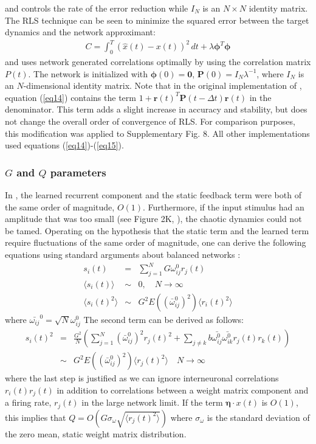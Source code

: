 \documentclass[11pt]{article} %
\begin{document}
and controls the rate of the error reduction while $I_N$ is an $N\times N$ identity matrix.  
The RLS technique can be seen to minimize the squared error between 
the target dynamics and the network approximant:
\begin{eqnarray}
C = \int_0^T(\hat{x}(t)-x(t))^2\,dt + \lambda \bm{\phi}^T \bm{\phi}  
\end{eqnarray}
and uses network generated correlations optimally by using the correlation matrix $P(t)$.  
The network is initialized with $\bm{\phi}(0) = \bm 0$, $\bm P(0) = I_N\lambda^{-1}$, 
where $I_N$ is an $N$-dimensional identity matrix.  
Note that in the original implementation of \cite{FORCE1}, 
equation (\ref{eq14}) contains the term $1+\bm r(t)^T \bm P(t-\Delta t) \bm r(t)$ in the denominator.  
This term adds a slight increase in accuracy and stability, but does not change 
the overall order of convergence of RLS.  
For comparison purposes, this modification was applied to Supplementary Fig. 8.  
All other implementations used equations (\ref{eq14})-(\ref{eq15}).   

\subsubsection*{$G$ and $Q$ parameters}  

In \cite{FORCE1}, the learned recurrent component and the static feedback term 
were both of the same order of magnitude, $O(1)$.  
Furthermore, if the input stimulus had an amplitude that was too small 
(see Figure 2K, \cite{FORCE1}), the chaotic dynamics could not be tamed.  
Operating on the hypothesis that the static term and the learned term require 
fluctuations of the same order of magnitude, one can derive the following 
equations using standard arguments about balanced networks \cite{sompo1}:
\begin{eqnarray}
s_i(t)&=&\sum_{j=1}^N G\omega_{ij}^0 r_j(t) \\
\langle s_i(t) \rangle &\sim& 0, \quad N\rightarrow \infty\\
\langle s_i(t)^2\rangle & \sim & G^2 E((\bar{\omega}_{ij}^0)^2) \langle r_i(t)^2\rangle 
\end{eqnarray}
where $\bar{\omega_{ij}}^0 = \sqrt{N} \omega_{ij}^0$
The second term can be derived as follows:
\begin{eqnarray}
s_i(t)^2 &=&\frac{ G^2}{N}\left( \sum_{j=1}^N (\bar{\omega}_{ij}^0)^2 r_j(t)^2 + \sum_{j\neq k}b\bar{\omega_{ij}^0}\bar{\omega_{ik}^0} r_j(t)r_k(t)   \right)\\
&\sim & {G^2} E((\bar{\omega}^0_{ij})^2)\langle r_{j}(t)^2\rangle \quad N\rightarrow \infty  
\end{eqnarray}
where the last step is justified as we can ignore interneuronal correlations 
$r_i(t)r_j(t)$ in addition to correlations between a weight matrix component 
and a firing rate, $r_j(t)$ in the large network limit.   
If the term $\bm \eta \cdot x(t)$ is $O(1)$, this implies that 
$Q = O({G} \sigma_{\omega} \sqrt{\langle r_{j}(t)^2\rangle})$ where 
$\sigma_\omega$ is the standard deviation of the zero mean, 
static weight matrix distribution. 
\end{document}
